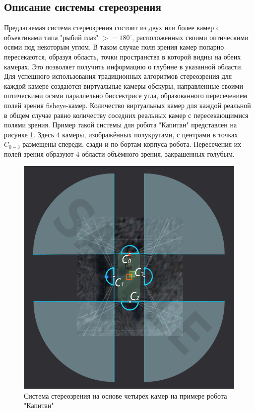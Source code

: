 \subsection{Описание системы стереозрения}

Предлагаемая система стереозрения состоит из двух или более камер с объективами типа "рыбий глаз" $>=180^\circ$,
расположенных своими оптическими осями под некоторым углом. В таком случае поля зрения камер попарно пересекаются, 
образуя  область, точки пространства в которой видны на обеих камерах. Это позволяет получить информацию о 
глубине в указанной области. 
Для успешного использования традиционных алгоритмов стереозрения для каждой камере создаются виртуальные камеры-обскуры, направленные 
своими оптическими осями параллельно биссектрисе угла, образованного пересечением полей зрения fisheye-камер. Количество
 виртуальных камер для каждой реальной в общем случае равно количеству соседних реальных камер с пересекающимися полями 
 зрения. Пример такой системы для робота "Капитан" представлен на рисунке \ref{pic:4cam_system}. Здесь 4 камеры, изображённых
 полукругами, с центрами в точках $C_{0-3}$ размещены спереди, сзади и по бортам корпуса робота. Пересечения их полей зрения 
 образуют 4 области объёмного зрения, закрашенных голубым.    %
 \begin{figure}[H]
    \begin{center}
        \includegraphics[scale=0.5]{pics/sample_4cam.png}                                                               %
        \caption{Система стереозрения на основе четырёх камер на примере робота "Капитан"}
        \label{pic:4cam_system}
    \end{center}
\end{figure}
